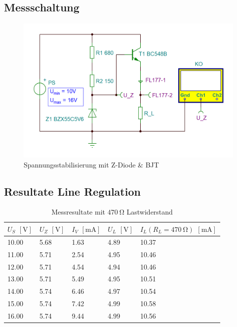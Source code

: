 \documentclass[../main.tex]{subfiles}
\begin{document}
\subsection{Messschaltung}

\begin{figure}[h]
    \centering
    \includegraphics[scale=0.35]{assets/task2_voltage_stable/messschaltung_task2.PNG}
    \caption{Spannungsstabilisierung mit Z-Diode \& BJT}
    \label{fig:circuit_voltage_stabilization}
\end{figure}

\subsection{Resultate Line Regulation}


\begin{table}[h]
\renewcommand{\arraystretch}{1.3}
\centering
\begin{tabular}{l|llll}
\textbf{$U_S$} $[\si{\volt}]$ & \textbf{$U_Z$} $[\si{\volt}]$ & \textbf{$I_V$} $[\si{\milli\ampere}]$ & \textbf{$U_L$} $[\si{\volt}]$ & \textbf{$I_L (R_L = \SI{470}{\ohm})$} $[\si{\milli\ampere}]$\\ \hline
10.00       & 5.68        & 1.63        & 4.89        & 10.37       \\
11.00       & 5.71        & 2.54        & 4.95        & 10.46       \\
12.00       & 5.71        & 4.54        & 4.94        & 10.46       \\
13.00       & 5.71        & 5.49        & 4.95        & 10.51       \\
14.00       & 5.74        & 6.46        & 4.97        & 10.54       \\
15.00       & 5.74        & 7.42        & 4.99        & 10.58       \\
16.00       & 5.74        & 9.44        & 4.99        & 10.56      

\end{tabular}
\caption{Messresultate mit $\SI{470}{\ohm}$ Lastwiderstand}
\label{tab:result_task2_R680}
\end{table}
\end{document}
